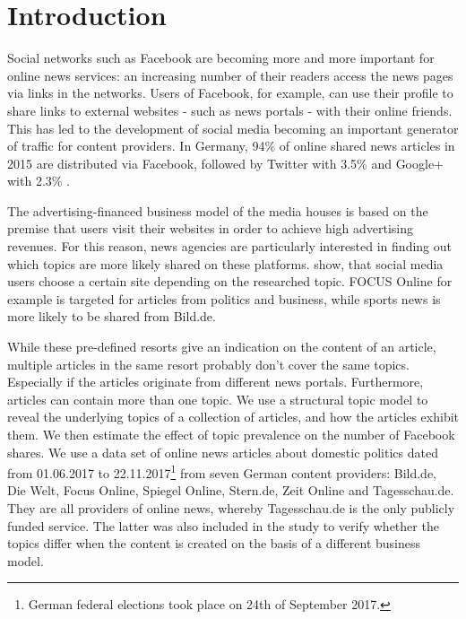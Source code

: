 \documentclass[12pt,a4paper,notitlepage]{article}
\begin{document}
\section{Introduction}

Social networks such as Facebook are becoming more and more important for online news services: an increasing number of their readers access the news pages via links in the networks. Users of Facebook, for example, can use their profile to share links to external websites - such as news portals - with their online friends. This has led to the development of social media becoming an important generator of traffic for content providers. In Germany, 94\% of online shared news articles in 2015 are distributed via Facebook, followed by Twitter with 3.5\% and Google+ with 2.3\% \citep{schiller_development_2016}. 

The advertising-financed business model of the media houses is based on the premise that users visit their websites in order to achieve high advertising revenues. For this reason, news agencies are particularly interested in finding out which topics are more likely shared on these platforms. \citet{schiller_development_2016} show, that social media users choose a certain site depending on the researched topic. FOCUS Online for example is targeted for articles from politics and business, while sports news is more likely to be shared from Bild.de. 

While these pre-defined resorts give an indication on the content of an article, multiple articles in the same resort probably don't cover the same topics. Especially if the articles originate from different news portals. Furthermore, articles can contain more than one topic. We use a structural topic model to reveal the underlying topics of a collection of articles, and how the articles exhibit them. We then estimate the effect of topic prevalence on the number of Facebook shares. We use a data set of online news articles about domestic politics dated from 01.06.2017 to 22.11.2017\footnote{German federal elections took place on 24th of September 2017.} from seven German content providers: Bild.de, Die Welt, Focus Online, Spiegel Online, Stern.de, Zeit Online and Tagesschau.de. They are all providers of online news, whereby Tagesschau.de is the only publicly funded service. The latter was also included in the study to verify whether the topics differ when the content is created on the basis of a different business model. 
\end{document}
